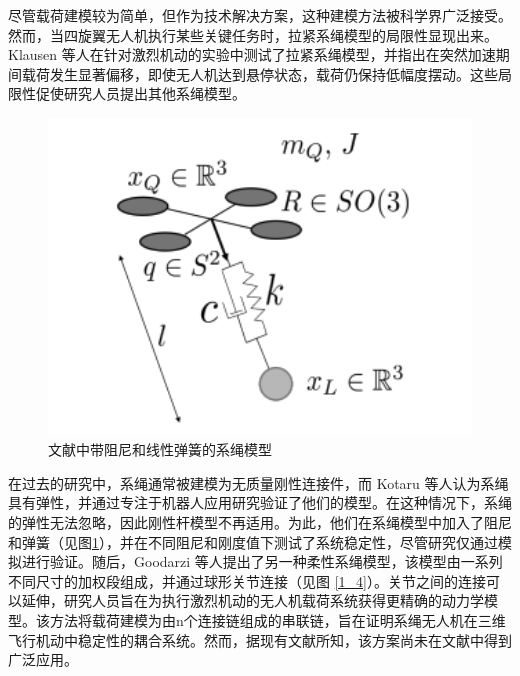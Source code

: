 \documentclass[lang=chs, degree=master, blindreview=false, winfonts=true]{yanputhesis}
\begin{document}
尽管载荷建模较为简单，但作为技术解决方案，这种建模方法被科学界广泛接受。然而，当四旋翼无人机执行某些关键任务时，拉紧系绳模型的局限性显现出来\cite{castillo2019disturbance,estevez2021hybrid}。Klausen 等人\cite{klausen2017nonlinear}在针对激烈机动的实验中测试了拉紧系绳模型，并指出在突然加速期间载荷发生显著偏移，即使无人机达到悬停状态，载荷仍保持低幅度摆动。这些局限性促使研究人员提出其他系绳模型。


\begin{figure}[hbt!]
	\centering 
	\includegraphics[width=28pc]{picture/1_3.png} 
	\caption{文献中带阻尼和线性弹簧的系绳模型} \label{1_3}
\end{figure}
在过去的研究中，系绳通常被建模为无质量刚性连接件，而 Kotaru 等人\cite{kotaru2017dynamics}认为系绳具有弹性，并通过专注于机器人应用研究验证了他们的模型。在这种情况下，系绳的弹性无法忽略，因此刚性杆模型不再适用。为此，他们在系绳模型中加入了阻尼和弹簧（见图\ref{1_3}），并在不同阻尼和刚度值下测试了系统稳定性，尽管研究仅通过模拟进行验证。随后，Goodarzi 等人\cite{goodarzi2015geometric}提出了另一种柔性系绳模型，该模型由一系列不同尺寸的加权段组成，并通过球形关节连接（见图 \ref{1_4}）。关节之间的连接可以延伸，研究人员旨在为执行激烈机动的无人机载荷系统获得更精确的动力学模型。该方法将载荷建模为由n个连接链组成的串联链，旨在证明系绳无人机在三维飞行机动中稳定性的耦合系统。然而，据现有文献所知，该方案尚未在文献中得到广泛应用。
\end{document}
